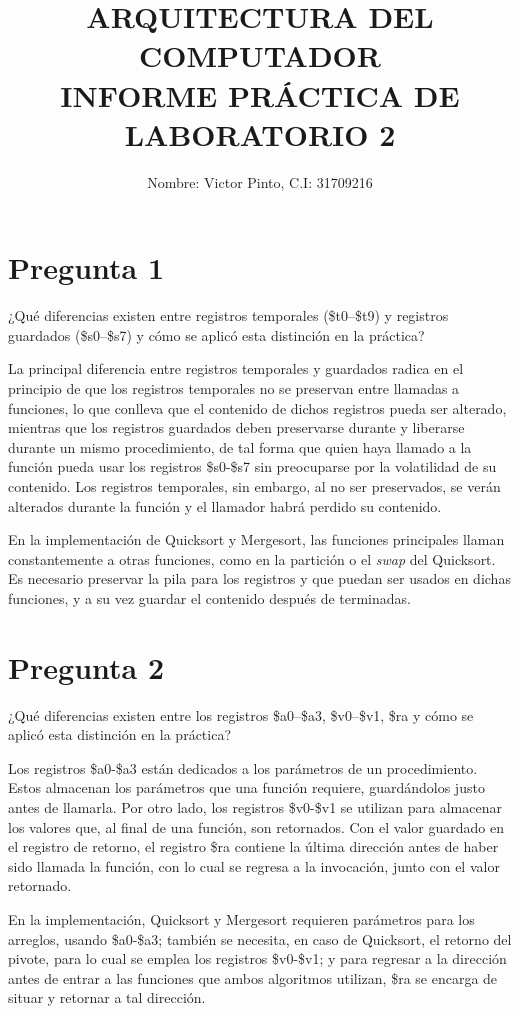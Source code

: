 \documentclass[12pt]{article}
\title{ARQUITECTURA DEL COMPUTADOR \\ INFORME PRÁCTICA DE LABORATORIO 2}
\author{Nombre: Victor Pinto, C.I: 31709216}
\date{}
\begin{document}
\maketitle

\section*{Pregunta 1}
¿Qué diferencias existen entre registros temporales (\$t0–\$t9) y registros guardados (\$s0–\$s7) y cómo se aplicó esta distinción en la práctica?

La principal diferencia entre registros temporales y guardados radica en el principio de que los registros temporales no se preservan entre llamadas a funciones, lo que conlleva que el contenido de dichos registros pueda ser alterado, mientras que los registros guardados deben preservarse durante y liberarse durante un mismo procedimiento, de tal forma que quien haya llamado a la función pueda usar los registros \$s0-\$s7 sin preocuparse por la volatilidad de su contenido. Los registros temporales, sin embargo, al no ser preservados, se verán alterados durante la función y el llamador habrá perdido su contenido.

En la implementación de Quicksort y Mergesort, las funciones principales llaman constantemente a otras funciones, como en la partición o el \textit{swap} del Quicksort. Es necesario preservar la pila para los registros y que puedan ser usados en dichas funciones, y a su vez guardar el contenido después de terminadas.

\section*{Pregunta 2}
¿Qué diferencias existen entre los registros \$a0–\$a3, \$v0–\$v1, \$ra y cómo se aplicó esta distinción en la práctica?

Los registros \$a0-\$a3 están dedicados a los parámetros de un procedimiento. Estos almacenan los parámetros que una función requiere, guardándolos justo antes de llamarla. Por otro lado, los registros \$v0-\$v1 se utilizan para almacenar los valores que, al final de una función, son retornados. Con el valor guardado en el registro de retorno, el registro \$ra contiene la última dirección antes de haber sido llamada la función, con lo cual se regresa a la invocación, junto con el valor retornado.

En la implementación, Quicksort y Mergesort requieren parámetros para los arreglos, usando \$a0-\$a3; también se necesita, en caso de Quicksort, el retorno del pivote, para lo cual se emplea los registros \$v0-\$v1; y para regresar a la dirección antes de entrar a las funciones que ambos algoritmos utilizan, \$ra se encarga de situar y retornar a tal dirección.
\end{document}

